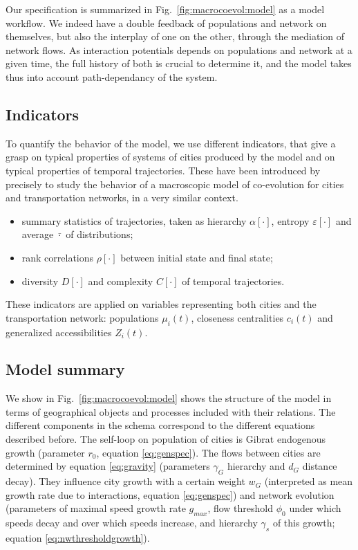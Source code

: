 \documentclass[11pt]{article}
\begin{document}
Our specification is summarized in Fig.~\ref{fig:macrocoevol:model} as a model workflow. We indeed have a double feedback of populations and network on themselves, but also the interplay of one on the other, through the mediation of network flows. As interaction potentials depends on populations and network at a given time, the full history of both is crucial to determine it, and the model takes thus into account path-dependancy of the system.



\subsection{Indicators}

To quantify the behavior of the model, we use different indicators, that give a grasp on typical properties of systems of cities produced by the model and on typical properties of temporal trajectories. These have been introduced by \cite{2018arXiv180900861R} precisely to study the behavior of a macroscopic model of co-evolution for cities and transportation networks, in a very similar context.
\begin{itemize}
	\item summary statistics of trajectories, taken as hierarchy $\alpha\left[\cdot\right]$, entropy $\varepsilon\left[\cdot\right]$ and average $\bar{\cdot}$ of distributions;
	\item rank correlations $\rho\left[\cdot\right]$ between initial state and final state;
	\item diversity $D\left[\cdot\right]$ and complexity $C\left[\cdot\right]$ of temporal trajectories.
\end{itemize}

These indicators are applied on variables representing both cities and the transportation network: populations $\mu_i(t)$, closeness centralities $c_i (t)$ and generalized accessibilities $Z_i (t)$.


\subsection{Model summary}


We show in Fig.~\ref{fig:macrocoevol:model} shows the structure of the model in terms of geographical objects and processes included with their relations. The different components in the schema correspond to the different equations described before. The self-loop on population of cities is Gibrat endogenous growth (parameter $r_0$, equation \ref{eq:genspec}). The flows between cities are determined by equation \ref{eq:gravity} (parameters $\gamma_G$ hierarchy and $d_G$ distance decay). They influence city growth with a certain weight $w_G$ (interpreted as mean growth rate due to interactions, equation \ref{eq:genspec}) and network evolution (parameters of maximal speed growth rate $g_{max}$, flow threshold $\phi_0$ under which speeds decay and over which speeds increase, and hierarchy $\gamma_s$ of this growth; equation \ref{eq:nwthresholdgrowth}).
\end{document}
